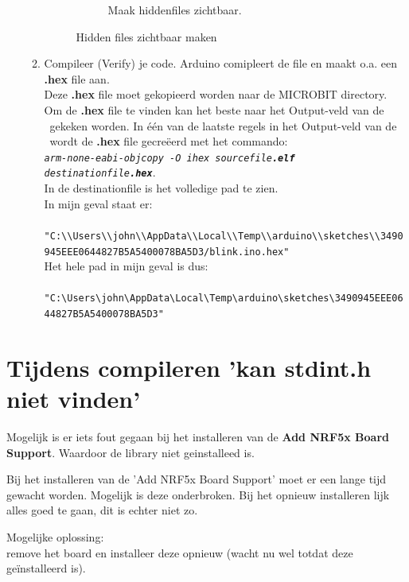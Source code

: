 \begin{enumerate}
\begin{enumerate}
\begin{figure}[h!]
\begin{subfigure}[b]{0.49\textwidth}
            			\caption{Maak hiddenfiles zichtbaar. }
            			\label{fig:hidFile}
            		\end{subfigure}
            		\captionsetup{justification=centering}
            		\caption{Hidden files zichtbaar maken }
            		\label{fig:hidF}
            	\end{figure}
            
   \item
       Compileer (Verify)  je code. Arduino comipleert de file en maakt o.a. een \textbf{.hex} file aan. \\
          Deze \textbf{.hex} file moet gekopieerd worden naar de MICROBIT directory.\\
          Om de \textbf{.hex} file te vinden kan het beste naar het Output-veld van de \ardIDE ~gekeken worden.
          In één van de laatste regels in het Output-veld van de \ardIDE ~wordt de \textbf{.hex} file gecreëerd met het commando:\\
          \texttt{\textit{arm-none-eabi-objcopy -O ihex sourcefile\textbf{.elf} destinationfile\textbf{.hex}}}.\\ 
          In de destinationfile is het volledige pad te zien.\\
          In mijn geval staat er:\\
          \lstinline[stringstyle=\color{red}]| "C:\\Users\\john\\AppData\\Local\\Temp\\arduino\\sketches\\3490945EEE0644827B5A5400078BA5D3/blink.ino.hex"|\\
          Het hele pad in  mijn geval is dus:\\
           \lstinline[stringstyle=\color{red},basicstyle=\ttfamily\small]| "C:\Users\john\AppData\Local\Temp\arduino\sketches\3490945EEE0644827B5A5400078BA5D3"|\\
          \end{enumerate}       
  
 \end{enumerate}
 
 \section{Tijdens compileren  'kan stdint.h niet vinden'}
 Mogelijk is er iets fout gegaan bij het installeren van de \textbf{Add NRF5x Board Support}. Waardoor de library niet geinstalleed is.
 
 Bij het installeren van de 'Add NRF5x Board Support' moet er een lange tijd gewacht worden. Mogelijk is deze onderbroken. Bij het opnieuw installeren lijk alles goed te gaan, dit is echter niet zo.
 
 Mogelijke oplossing:\\
 remove het board en installeer deze opnieuw (wacht nu wel totdat deze geïnstalleerd is).
 
 